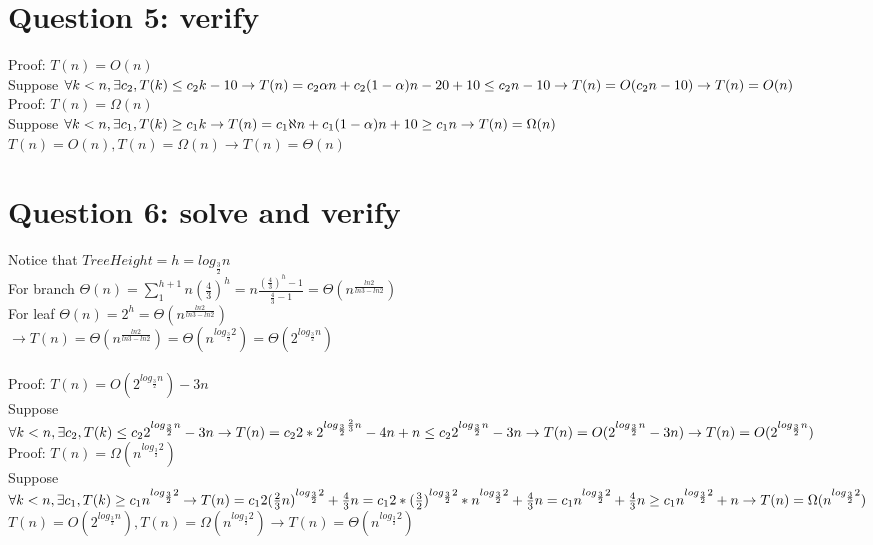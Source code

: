 \documentclass[]{article}
\begin{document}
\section{Question 5: verify}
Proof: $ T(n) = O(n)$ \\
Suppose $\forall k<n, \exists c_{2}, T(k) \le c_{2}k - 10\\
\rightarrow T(n) = c_{2}\alpha n + c_{2}(1-\alpha) n - 20 + 10 \le c_{2}n - 10\\
\rightarrow T(n) = O(c_{2}n-10)\\
\rightarrow T(n) = O(n)\\$
\\
Proof: $ T(n) = \Omega(n)$ \\
Suppose $\forall k<n, \exists c_{1}, T(k) \ge c_{1}k\\
\rightarrow T(n) = c_{1}\aleph n + c_{1}(1-\alpha) n + 10 \ge c_{1}n\\
\rightarrow T(n) = \Omega(n)\\$
\\
$T(n) = O(n), T(n) = \Omega(n) \rightarrow T(n) = \Theta(n)$

\section{Question 6: solve and verify}
Notice that $TreeHeight=h = log_{\frac{3}{2}}n$\\
For branch $\Theta(n) = \sum _{1}^{h + 1} n(\frac{4}{3})^h = n\frac{(\frac{4}{3})^h - 1}{\frac{4}{3} - 1} = \Theta(n^{\frac{ln2}{ln3-ln2}})$\\
For leaf $\Theta(n) = 2^h = \Theta(n^{\frac{ln2}{ln3-ln2}})$\\
$\rightarrow T(n) = \Theta(n^{\frac{ln2}{ln3-ln2}}) = \Theta(n^{log_{\frac{3}{2}}2}) = \Theta(2^{log_{\frac{3}{2}}n})$\\
\\
Proof: $ T(n) = O(2^{log_{\frac{3}{2}}n}) - 3n$ \\
Suppose $\forall k<n, \exists c_{2}, T(k) \le c_{2}2^{log_{\frac{3}{2}}n} - 3n\\
\rightarrow T(n) = c_{2}2*2^{log_{\frac{3}{2}}\frac{2}{3}n} -4n + n \le c_{2}2^{log_{\frac{3}{2}}n} -3n\\
\rightarrow T(n) =  O(2^{log_{\frac{3}{2}}n} -3n)\\
\rightarrow T(n) =  O(2^{log_{\frac{3}{2}}n})\\$
\\
Proof: $ T(n) = \Omega(n^{log_{\frac{3}{2}}2})$ \\
Suppose $\forall k<n, \exists c_{1}, T(k) \ge c_{1}n^{log_{\frac{3}{2}}2}\\
\rightarrow T(n) = c_{1}2(\frac{2}{3}n)^{log_{\frac{3}{2}}2} + \frac{4}{3}n
 = c_{1}2*(\frac{3}{2})^{log_{\frac{3}{2}}2}*n^{log_{\frac{3}{2}}2} + \frac{4}{3}n = c_{1}n^{log_{\frac{3}{2}}2} + \frac{4}{3}n \ge c_{1}n^{log_{\frac{3}{2}}2} + n\\
\rightarrow T(n) = \Omega(n^{log_{\frac{3}{2}}2})\\$
\\
$T(n) =  O(2^{log_{\frac{3}{2}}n}), T(n) = \Omega(n^{log_{\frac{3}{2}}2}) \rightarrow T(n) = \Theta(n^{log_{\frac{3}{2}}2})$
\end{document}
